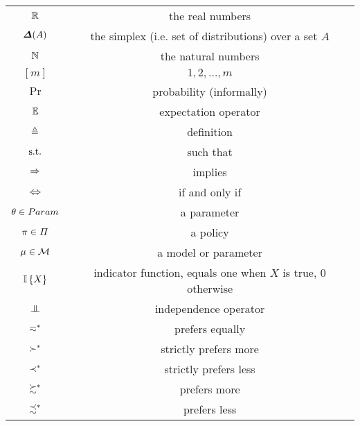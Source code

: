 \begin{tabular}{cc}
  ${\mathbb{R}}$ & the real numbers\\
  $\Simplex(A)$ & the simplex (i.e. set of distributions) over a set $A$\\
  ${\mathbb{N}}$ & the natural numbers\\
  $[m]$ & $1, 2, \ldots, m$\\
  $\Pr$ & probability (informally)\\
  $\mathop{\mbox{\ensuremath{\mathbb{E}}}}\nolimits$ & expectation operator\\
  $\mathrel{\triangleq}$ & definition\\
  $\textrm{s.t.}$ & such that\\
  $\Rightarrow$ & implies\\
  $\Leftrightarrow$ & if and only if\\
  $\theta \in Param$ & a parameter\\
  $\pi \in \Pi$ & a policy \\
  $\mu \in {\mathcal{M}}$ & a model or parameter\\
  $\mathop{\mbox{\ensuremath{\mathbb{I}}}}\left\{X\right\}$ & indicator function, equals one when $X$ is true, 0 otherwise\\
  $\indep$ & independence operator\\
  $\eqsim^*$ & prefers equally\\
  $\succ^*$ & strictly prefers more\\
  $\prec^*$ & strictly prefers less\\
  $\succsim^*$ & prefers more \\
  $\precsim^*$ & prefers less
\end{tabular}
